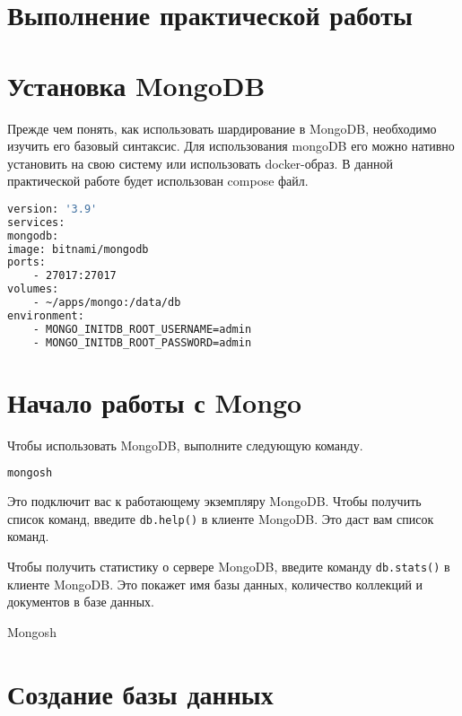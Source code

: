 \graphicspath{{img}} %

\clearpage
\section*{\LARGE Выполнение практической работы}

\section{Установка MongoDB}

Прежде чем понять, как использовать шардирование в MongoDB,
необходимо изучить его базовый синтаксис.
Для использования mongoDB его можно нативно установить на свою
систему или использовать docker-образ. В данной практической работе будет
использован compose файл.

\begin{lstlisting}[language=bash]
version: '3.9'
services:
mongodb:
image: bitnami/mongodb
ports:
	- 27017:27017
volumes:
	- ~/apps/mongo:/data/db
environment:
	- MONGO_INITDB_ROOT_USERNAME=admin
	- MONGO_INITDB_ROOT_PASSWORD=admin
\end{lstlisting}

\clearpage
\section{Начало работы с Mongo}

Чтобы использовать MongoDB, выполните следующую команду.

\begin{lstlisting}[language=bash]
mongosh
\end{lstlisting}

Это подключит вас к работающему экземпляру MongoDB.
Чтобы получить список команд, введите \texttt{db.help()} в клиенте
MongoDB. Это даст вам список команд.\par
Чтобы получить статистику о сервере MongoDB, введите
команду \texttt{db.stats()} в клиенте MongoDB. Это покажет имя базы данных,
количество коллекций и документов в базе данных.

\begin{image}
	\caption{Mongosh}
	\label{fig:mongosh}
\end{image}

\clearpage
\section{Создание базы данных}

